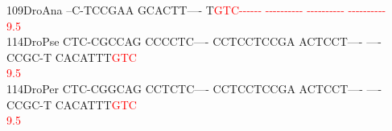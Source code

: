 \documentclass[11pt,twoside,reqno,a4paper]{article}
\begin{document}
{109\hspace*{1\charwidth}DroAna	--C-TCCGAA	GCACTT----	T\textcolor{red}{G}\textcolor{red}{T}\textcolor{red}{C}\textcolor{red}{-}\textcolor{red}{-}\textcolor{red}{-}\textcolor{red}{-}\textcolor{red}{-}\textcolor{red}{-}	\textcolor{red}{-}\textcolor{red}{-}\textcolor{red}{-}\textcolor{red}{-}\textcolor{red}{-}\textcolor{red}{-}\textcolor{red}{-}\textcolor{red}{-}\textcolor{red}{-}\textcolor{red}{-}	\textcolor{red}{-}\textcolor{red}{-}\textcolor{red}{-}\textcolor{red}{-}\textcolor{red}{-}\textcolor{red}{-}\textcolor{red}{-}\textcolor{red}{-}\textcolor{red}{-}\textcolor{red}{-}	\textcolor{red}{-}\textcolor{red}{-}\textcolor{red}{-}\textcolor{red}{-}\textcolor{red}{-}\textcolor{red}{-}\textcolor{red}{-}\textcolor{red}{-}\textcolor{red}{-}\textcolor{red}{-}	\\
\hspace*{4\charwidth}\hspace*{7\charwidth}\hspace*{1\charwidth}\hspace*{1\charwidth}\hspace*{21\charwidth}\textcolor{red}{9.5}\hspace*{1\charwidth}\hspace*{1\charwidth}\hspace*{1\charwidth}\hspace*{1\charwidth}\\
114\hspace*{1\charwidth}DroPse	CTC-CGCCAG	CCCCTC----	CCTCCTCCGA	ACTCCT----	----CCGC-T	CACATTT\textcolor{red}{G}\textcolor{red}{T}\textcolor{red}{C}	\\
\hspace*{4\charwidth}\hspace*{7\charwidth}\hspace*{1\charwidth}\hspace*{1\charwidth}\hspace*{1\charwidth}\hspace*{1\charwidth}\hspace*{1\charwidth}\hspace*{57\charwidth}\textcolor{red}{9.5}\hspace*{1\charwidth}\\
114\hspace*{1\charwidth}DroPer	CTC-CGGCAG	CCTCTC----	CCTCCTCCGA	ACTCCT----	----CCGC-T	CACATTT\textcolor{red}{G}\textcolor{red}{T}\textcolor{red}{C}	\\
\hspace*{4\charwidth}\hspace*{7\charwidth}\hspace*{1\charwidth}\hspace*{1\charwidth}\hspace*{1\charwidth}\hspace*{1\charwidth}\hspace*{1\charwidth}\hspace*{57\charwidth}\textcolor{red}{9.5}\hspace*{1\charwidth}\\
}
\end{document}
